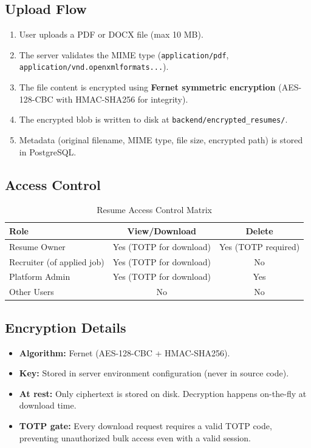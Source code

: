 \documentclass[12pt,a4paper]{article}
\begin{document}
\subsection{Upload Flow}
\begin{enumerate}
  \item User uploads a PDF or DOCX file (max 10 MB).
  \item The server validates the MIME type (\texttt{application/pdf}, \texttt{application/vnd.openxmlformats...}).
  \item The file content is encrypted using \textbf{Fernet symmetric encryption} (AES-128-CBC with HMAC-SHA256 for integrity).
  \item The encrypted blob is written to disk at \texttt{backend/encrypted\_resumes/}.
  \item Metadata (original filename, MIME type, file size, encrypted path) is stored in PostgreSQL.
\end{enumerate}

\subsection{Access Control}
\begin{table}[H]
\centering
\begin{tabular}{lcc}
\toprule
\textbf{Role} & \textbf{View/Download} & \textbf{Delete} \\
\midrule
Resume Owner & Yes (TOTP for download) & Yes (TOTP required) \\
Recruiter (of applied job) & Yes (TOTP for download) & No \\
Platform Admin & Yes (TOTP for download) & Yes \\
Other Users & No & No \\
\bottomrule
\end{tabular}
\caption{Resume Access Control Matrix}
\end{table}

\subsection{Encryption Details}
\begin{itemize}
  \item \textbf{Algorithm:} Fernet (AES-128-CBC + HMAC-SHA256).
  \item \textbf{Key:} Stored in server environment configuration (never in source code).
  \item \textbf{At rest:} Only ciphertext is stored on disk. Decryption happens on-the-fly at download time.
  \item \textbf{TOTP gate:} Every download request requires a valid TOTP code, preventing unauthorized bulk access even with a valid session.
\end{itemize}
\end{document}
